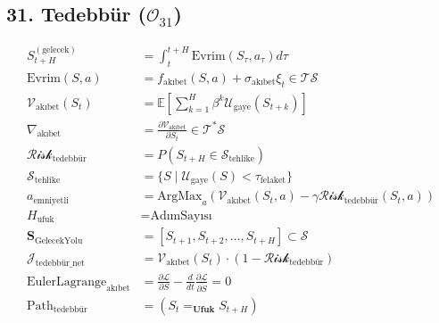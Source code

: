 \documentclass[11pt, a4paper]{article}
\begin{document}
\subsection{31. Tedebbür ($\mathcal{O}_{31}$)}
\begin{align}
S_{t+H}^{(\text{gelecek})} &= \int_t^{t+H} \text{Evrim}(S_\tau, a_\tau) d\tau \\
\text{Evrim}(S, a) &= f_{\text{akıbet}}(S, a) + \sigma_{\text{akıbet}} \xi_t \in \mathcal{T}\mathcal{S} \\
\mathcal{V}_{\text{akıbet}}(S_t) &= \mathbb{E}\left[ \sum_{k=1}^H \beta^k \mathcal{U}_{\text{gaye}}(S_{t+k}) \right] \\
\nabla_{\text{akıbet}} &= \frac{\partial \mathcal{V}_{\text{akıbet}}}{\partial S_t} \in \mathcal{T}^*\mathcal{S} \\
\mathcal{Risk}_{\text{tedebbür}} &= P(S_{t+H} \in \mathcal{S}_{\text{tehlike}}) \\
\mathcal{S}_{\text{tehlike}} &= \{ S \mid \mathcal{U}_{\text{gaye}}(S) < \tau_{\text{felaket}} \} \\
a_{\text{emniyetli}} &= \text{ArgMax}_a \left( \mathcal{V}_{\text{akıbet}}(S_t, a) - \gamma \mathcal{Risk}_{\text{tedebbür}}(S_t, a) \right) \\
H_{\text{ufuk}} &= \text{AdımSayısı} \\
\mathbf{S}_{\text{GelecekYolu}} &= [S_{t+1}, S_{t+2}, \dots, S_{t+H}] \subset \mathcal{S} \\
\mathcal{J}_{\text{tedebbür\_net}} &= \mathcal{V}_{\text{akıbet}}(S_t) \cdot (1 - \mathcal{Risk}_{\text{tedebbür}}) \\
\text{EulerLagrange}_{\text{akıbet}} &= \frac{\partial \mathcal{L}}{\partial S} - \frac{d}{dt} \frac{\partial \mathcal{L}}{\partial \dot{S}} = 0 \\
\text{Path}_{\text{tedebbür}} &= (S_t =_{\mathbf{Ufuk}} S_{t+H})
\end{align}
\end{document}
